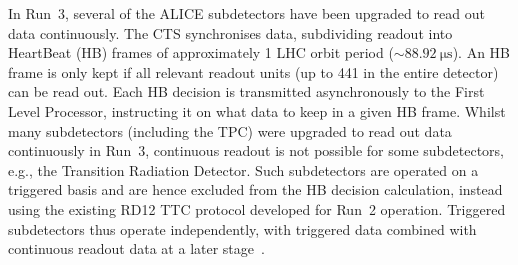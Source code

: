 In Run~3, several of the ALICE subdetectors have been upgraded to read out data continuously. The CTS synchronises data, subdividing readout into HeartBeat (HB) frames of approximately 1 LHC orbit period ($\sim\SI{88.92}{\micro\second}$). An HB frame is only kept if all relevant readout units (up to 441 in the entire detector) can be read out. Each HB decision is transmitted asynchronously to the First Level Processor, instructing it on what data to keep in a given HB frame. Whilst many subdetectors (including the TPC) were upgraded to read out data continuously in Run~3, continuous readout is not possible for some subdetectors, e.g.,  the Transition Radiation Detector. Such subdetectors are operated on a triggered basis and are hence excluded from the HB decision calculation, instead using the existing RD12 TTC protocol developed for Run~2 operation. Triggered subdetectors thus operate independently, with triggered data combined with continuous readout data at a later stage~\cite{alice-trigger-run3}.

